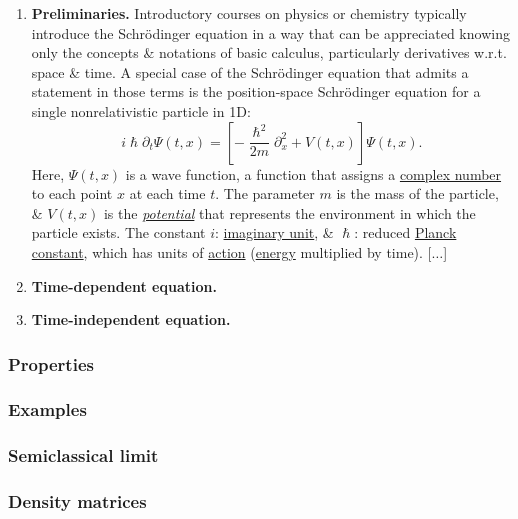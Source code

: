 \documentclass{article}
\begin{document}
\begin{enumerate}
	\item {\bf Preliminaries.} Introductory courses on physics or chemistry typically introduce the Schrödinger equation in a way that can be appreciated knowing only the concepts \& notations of basic calculus, particularly derivatives w.r.t. space \& time. A special case of the Schrödinger equation that admits a statement in those terms is the position-space Schrödinger equation for a single nonrelativistic particle in 1D:
	\begin{equation}
		\label{Schrodinger}
		i\hslash\partial_t\Psi(t,x) = \left[-\frac{\hslash^2}{2m}\partial_x^2 + V(t,x)\right]\Psi(t,x).
	\end{equation}
	Here, $\Psi(t,x)$ is a wave function, a function that assigns a \href{https://en.wikipedia.org/wiki/Complex_number}{complex number} to each point $x$ at each time $t$. The parameter $m$ is the mass of the particle, \& $V(t,x)$ is the \href{https://en.wikipedia.org/wiki/Scalar_Potential}{\it potential} that represents the environment in which the particle exists. The constant $i$: \href{https://en.wikipedia.org/wiki/Imaginary_unit}{imaginary unit}, \& $\hslash$: reduced \href{https://en.wikipedia.org/wiki/Planck_constant}{Planck constant}, which has units of \href{https://en.wikipedia.org/wiki/Action_(physics)}{action} (\href{https://en.wikipedia.org/wiki/Energy}{energy} multiplied by time). [$\ldots$]
	\item {\bf Time-dependent equation.}
	\item {\bf Time-independent equation.}
\end{enumerate}

\subsubsection{Properties}

\subsubsection{Examples}

\subsubsection{Semiclassical limit}

\subsubsection{Density matrices}
\end{document}
